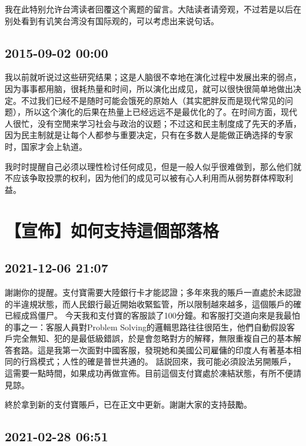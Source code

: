 \documentclass[twocolumn]{ctexart}
\begin{document}
我在此特别允许台湾读者回覆这个离题的留言。大陆读者请旁观，不过若是以后在别处看到有讥笑台湾没有国际观的，可以考虑出来说句话。
\subsection*{2015-09-02 00:00}
我以前就听说过这些研究结果；这是人脑很不幸地在演化过程中发展出来的弱点，因为事事都用脑，很耗热量和时间，所以演化出成见，就可以很快很简单地做出决定。不过我们已经不是随时可能会饿死的原始人（其实肥胖反而是现代常见的问题），所以这个演化的后果在热量上已经远远不是最优化的了。在时间方面，现代人很忙，没有空閒来学习社会与政治的议题；不过这和民主制度成了先天的矛盾，因为民主制就是让每个人都参与重要决定，只有在多数人是能做正确选择的专家时，国家才会上轨道。

我时时提醒自己必须以理性检讨任何成见，但是一般人似乎很难做到，那么他们就不应该争取投票的权利，因为他们的成见可以被有心人利用而从弱势群体榨取利益。\section*{【宣佈】如何支持這個部落格}
\subsection*{2021-12-06 21:07}

謝謝你的提醒。支付寶需要大陸銀行卡才能認證；多年來我的賬戶一直處於未認證的半違規狀態，而人民銀行最近開始收緊監管，所以限制越來越多，這個賬戶的確已經成爲僵尸。
今天我和支付寶的客服談了100分鐘。和客服打交道向來是我最怕的事之一：客服人員對Problem Solving的邏輯思路往往很陌生，他們自動假設客戶完全無知、犯的是最低級錯誤，於是會忽略對方的解釋，無限重複自己的基本解答套路。這是我第一次面對中國客服，發現她和美國公司雇傭的印度人有著基本相同的行爲模式；人性的確是普世共通的。
話説回來，我可能必須設法另開賬戶，這需要一點時間，如果成功再做宣佈。目前這個支付寶處於凍結狀態，有所不便請見諒。

終於拿到新的支付寶賬戶，已在正文中更新。謝謝大家的支持鼓勵。
\subsection*{2021-02-28 06:51}
\end{document}
